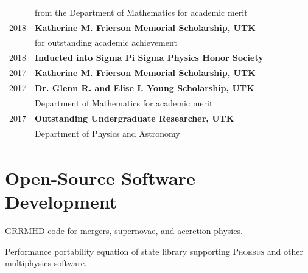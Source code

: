 \documentclass[letterpaper]{deedy-resume} %
\begin{document}
\begin{minipage}[t]{0.63\textwidth}
\begin{tabular}{rl}
          & from the Department of Mathematics for academic merit \\
  2018 & \textbf{Katherine M. Frierson Memorial Scholarship, UTK}\\
          & for outstanding academic achievement \\
  2018 & \textbf{Inducted into Sigma Pi Sigma Physics Honor Society} \\
  2017 & \textbf{Katherine M. Frierson Memorial Scholarship, UTK} \\
  2017 & \textbf{Dr. Glenn R. and Elise I. Young Scholarship, UTK}\\
          & Department of Mathematics for academic merit \\
  2017 & \textbf{Outstanding Undergraduate Researcher, UTK}\\
          & Department of Physics and Astronomy \\
\end{tabular}

\sectionspace %



\end{minipage} %
\clearpage


\section{Open-Source Software Development}

GRRMHD code for mergers, supernovae, and accretion physics.
\sectionspace %

Performance portability equation of state library supporting \textsc{Phoebus} and other multiphysics software.
\sectionspace %
\end{document}
